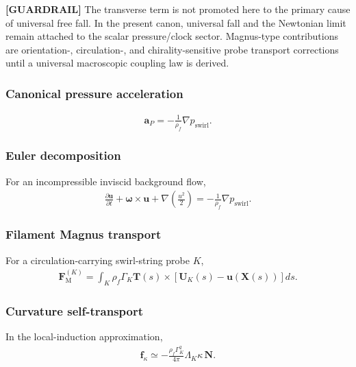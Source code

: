     \textbf{[GUARDRAIL]} The transverse term is not promoted here to the primary
    cause of universal free fall. In the present canon, universal fall and the
    Newtonian limit remain attached to the scalar pressure/clock sector. Magnus-type
    contributions are orientation-, circulation-, and chirality-sensitive probe
    transport corrections until a universal macroscopic coupling law is derived.

\subsubsection{Canonical pressure acceleration}
    \begin{align}
        \mathbf{a}_{P}
        =
        -\frac{1}{\rho_{\!f}}\nabla p_{\mathrm{swirl}}.
        \label{eq:rt_scalar_pressure_acceleration}
    \end{align}

\subsubsection{Euler decomposition}
    For an incompressible inviscid background flow,
    \begin{align}
        \frac{\partial \mathbf{u}}{\partial t}
        +
        \boldsymbol{\omega}\times\mathbf{u}
        +
        \nabla\left(\frac{u^2}{2}\right)
        =
        -\frac{1}{\rho_{\!f}}\nabla p_{\mathrm{swirl}}.
        \label{eq:rt_euler_decomposed_swirl_balance}
    \end{align}

\subsubsection{Filament Magnus transport}
    For a circulation-carrying swirl-string probe $K$,
    \begin{align}
        \mathbf{F}_{\mathrm{M}}^{(K)}
        =
        \int_K
        \rho_{\!f}\Gamma_K
        \mathbf{T}(s)\times
        \left[
            \mathbf{U}_K(s)-\mathbf{u}(\mathbf{X}(s))
        \right]ds.
        \label{eq:rt_filament_magnus_transport}
    \end{align}

\subsubsection{Curvature self-transport}
    In the local-induction approximation,
    \begin{align}
        \mathbf{f}_{\kappa}
        \simeq
        -\frac{\rho_{\!f}\Gamma_K^2}{4\pi}
        \Lambda_K\kappa\,\mathbf{N}.
        \label{eq:rt_curvature_self_transport}
    \end{align}

